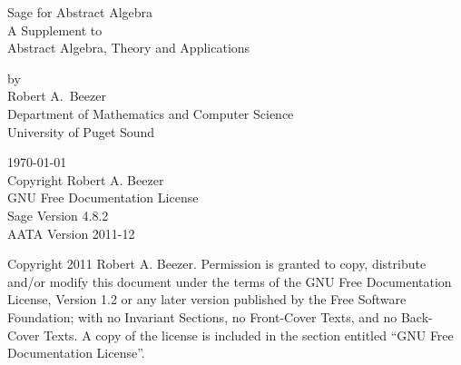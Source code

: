 \documentclass[12pt,oneside]{book}
\begin{document}
\thispagestyle{empty}
\begin{center}
{\fontsize{24}{24}\selectfont%
Sage for Abstract Algebra\\[24pt]
A Supplement to\\[6pt]
Abstract Algebra, Theory and Applications}
\par
{}
%
{\large by\\Robert A.\ Beezer\\Department of Mathematics and Computer Science\\University of Puget Sound}\par
%
%
%
\today\\
Copyright Robert A. Beezer\\
GNU Free Documentation License\\[12pt]
Sage Version 4.8.2\\
AATA Version 2011-12
%
\end{center}
\newpage
\thispagestyle{empty}
\noindent
Copyright 2011 Robert A. Beezer. Permission is granted to copy, distribute
and/or modify this document under the terms of the GNU Free
Documentation License, Version 1.2 or any later version published by the
Free Software Foundation; with no Invariant Sections, no Front-Cover
Texts, and no Back-Cover Texts. A copy of the license is included in the
section entitled ``GNU Free Documentation License''.
\par
{}
\newpage
\thispagestyle{empty}
\tableofcontents
\newpage
\thispagestyle{empty}
\end{document}
